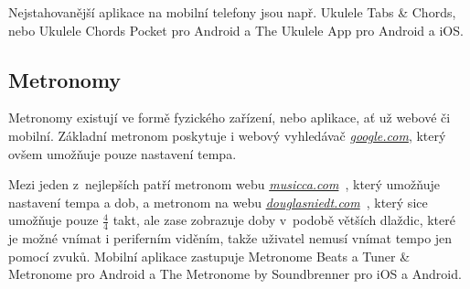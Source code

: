 Nejstahovanější aplikace na mobilní telefony jsou např. Ukulele Tabs \& Chords, nebo Ukulele Chords Pocket pro Android a The Ukulele App pro Android a iOS.

\subsection{Metronomy}
\label{ss:metronomes}
Metronomy existují ve formě fyzického zařízení, nebo aplikace, ať už webové či mobilní. Základní metronom poskytuje i webový vyhledávač \href{www.google.com}{\emph{google.com}}, který ovšem umožňuje pouze nastavení tempa.

Mezi jeden z~nejlepších patří metronom webu \href{www.musicca.com}{\emph{musicca.com}}~\cite{grubbe_2019_online}, který umožňuje nastavení tempa a dob, a metronom na webu \href{www.douglasniedt.com}{\emph{douglasniedt.com}}~\cite{niedt_2019_free}, který sice umožňuje pouze $ \frac{4}{4} $ takt, ale zase zobrazuje doby v~podobě větších dlaždic, které je možné vnímat i periferním viděním, takže uživatel nemusí vnímat tempo jen pomocí zvuků. Mobilní aplikace zastupuje Metronome Beats a Tuner \& Metronome pro Android a The Metronome by Soundbrenner pro iOS a Android.
